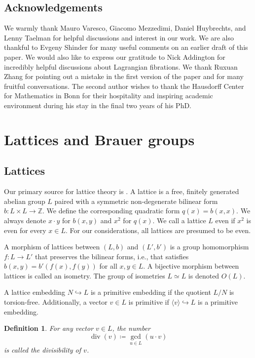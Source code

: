 \documentclass[11pt,twoside]{amsart}
\numberwithin{equation}{section}
\newtheorem{definition}[dummy]{Definition}
\theoremstyle{definition}
\theoremstyle{plain}
\newcommand{\Z}{\ensuremath{\mathbb{Z}}}
\def\dv{\operatorname{div}}
\begin{document}
\subsection*{Acknowledgements}
We warmly thank Mauro Varesco, Giacomo Mezzedimi, Daniel Huybrechts, and Lenny Taelman for helpful discussions and interest in our work. We are also thankful to Evgeny Shinder for many useful comments on an earlier draft of this paper. We would also like to express our gratitude to Nick Addington for incredibly helpful discussions about Lagrangian fibrations. We thank Ruxuan Zhang for pointing out a mistake in the first version of the paper and for many fruitful conversations. The second author wishes to thank the Hausdorff Center for Mathematics in Bonn for their hospitality and inspiring academic environment during his stay in the final two years of his PhD.

\section{Lattices and Brauer groups}

\subsection{Lattices}
Our primary source for lattice theory is \cite{Nik80}. A lattice is a free, finitely generated abelian group $L$ paired with a symmetric non-degenerate bilinear form $b: L\times L\rightarrow \Z$. We define the corresponding quadratic form $q(x) = b(x,x)$. We always denote $x \cdot y$ for $b(x,y)$ and $x^2$ for $q(x)$.  We call a lattice $L$ even if $x^2$ is even for every $x\in L$. For our considerations, all lattices are presumed to be even. 

A morphism of lattices between $(L,b)$ and $(L',b')$ is a group homomorphism $f: L\rightarrow L'$ that preserves the bilinear forms, i.e., that satisfies $b(x,y) = b'(f(x),f(y))$ for all $x,y\in L$. A bijective morphism between lattices is called an isometry. The group of isometries $L\simeq L$ is denoted $O(L)$.

A lattice embedding $N\hookrightarrow L$ is a primitive embedding if the quotient $L/N$ is torsion-free. Additionally, a vector $v\in L$ is primitive if $\langle v\rangle\hookrightarrow L$ is a primitive embedding.

\begin{definition}
    For any vector $v\in L$, the number $$\dv(v)\coloneqq \operatorname{gcd}_{u\in L}\left(u\cdot v\right)$$ is called the \textit{divisibility} of $v$.
\end{definition}
\end{document}
